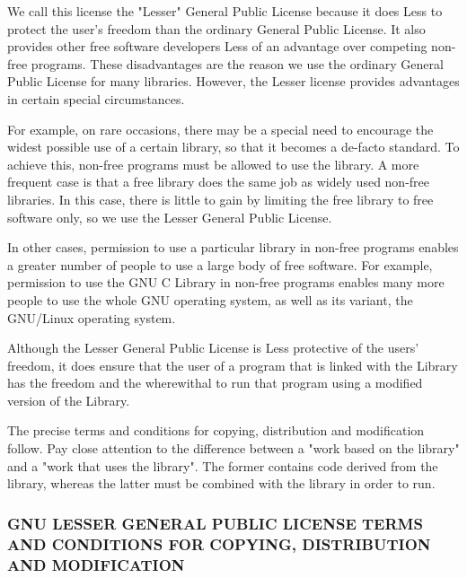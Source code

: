 We call this license the "Lesser" General Public License because it
does Less to protect the user's freedom than the ordinary General
Public License.  It also provides other free software developers Less
of an advantage over competing non-free programs.  These disadvantages
are the reason we use the ordinary General Public License for many
libraries.  However, the Lesser license provides advantages in certain
special circumstances.

For example, on rare occasions, there may be a special need to
encourage the widest possible use of a certain library, so that it
becomes a de-facto standard.  To achieve this, non-free programs must
be allowed to use the library.  A more frequent case is that a free
library does the same job as widely used non-free libraries.  In this
case, there is little to gain by limiting the free library to free
software only, so we use the Lesser General Public License.

In other cases, permission to use a particular library in non-free
programs enables a greater number of people to use a large body of
free software.  For example, permission to use the GNU C Library in
non-free programs enables many more people to use the whole GNU
operating system, as well as its variant, the GNU/Linux operating
system.

Although the Lesser General Public License is Less protective of the
users' freedom, it does ensure that the user of a program that is
linked with the Library has the freedom and the wherewithal to run
that program using a modified version of the Library.

The precise terms and conditions for copying, distribution and
modification follow.  Pay close attention to the difference between a
"work based on the library" and a "work that uses the library".  The
former contains code derived from the library, whereas the latter must
be combined with the library in order to run.

\subsubsection*{GNU LESSER GENERAL PUBLIC LICENSE
  TERMS AND CONDITIONS FOR COPYING, DISTRIBUTION AND MODIFICATION}

